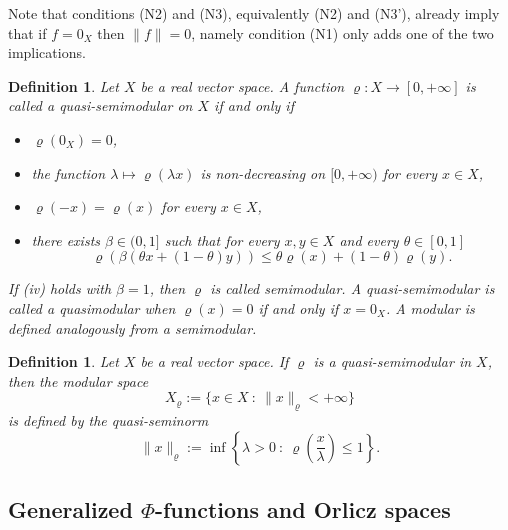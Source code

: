 \documentclass[a4paper,11pt,oneside,notitlepage]{article}
\newtheorem{definition}[theorem]{Definition}
\numberwithin{equation}{section}
\newcommand{\vrho}{\varrho}
\newcommand{\st}{ \ : \ }
\begin{document}
Note that conditions (N2) and (N3), equivalently (N2) and (N3'), already imply that if $f = 0_X$ then $\|f\| = 0$, namely condition (N1) only adds one of the two implications.

\begin{definition}
\label{def:modular}
    Let $X$ be a real vector space. A function $\vrho : X \to [0,+\infty]$ is called a quasi-semimodular on $X$ if and only if
    \begin{itemize}
        \item[(i)] $\vrho(0_X) = 0$,
        \item[(ii)] the function $\lambda \mapsto \vrho(\lambda x)$ is non-decreasing on $[0,+\infty)$ for every $x \in X$,
        \item[(iii)] $\vrho(-x) = \vrho(x)$ for every $x \in X$,
        \item[(iv)] there exists $\beta \in (0,1]$ such that for every $x,y \in X$ and every $\theta \in [0,1]$
        \begin{equation*}
            \vrho\left(\beta(\theta x + (1-\theta) y) \right) \le \theta \vrho(x) + (1-\theta) \vrho(y).
        \end{equation*}
    \end{itemize}
    If (iv) holds with $\beta = 1$, then $\vrho$ is called semimodular. A quasi-semimodular is called a quasimodular when $\vrho(x) = 0$ if and only if $x = 0_X$. A modular is defined analogously from a semimodular.
\end{definition}

\begin{definition}
\label{def_modular_space}
    Let $X$ be a real vector space. If $\vrho$ is a quasi-semimodular in $X$, then the modular space
    \begin{equation*}
        X_\vrho := \{x \in X \st \|x\|_\vrho < +\infty\}
    \end{equation*}
    is defined by the quasi-seminorm
    \begin{equation*}
        \|x\|_\vrho := \inf \left\{\lambda > 0  \st \vrho \left(\frac{x}{\lambda}\right) \le 1 \right\}.
    \end{equation*}
\end{definition}


\subsection{Generalized \texorpdfstring{$\Phi$}{}-functions and Orlicz spaces}
\label{orlicz}
\end{document}
